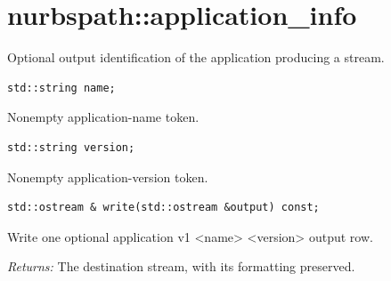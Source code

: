 \begingroup\setlength{\parskip}{2pt}
\section{nurbspath::application\_info}
Optional output identification of the application producing a stream.
\par\noindent\begin{minipage}{\linewidth}
\begin{lstlisting}[style=apireference]
std::string name;
\end{lstlisting}
{\footnotesize Nonempty application-name token.\par}
\end{minipage}\par\vspace{1pt}
\par\noindent\begin{minipage}{\linewidth}
\begin{lstlisting}[style=apireference]
std::string version;
\end{lstlisting}
{\footnotesize Nonempty application-version token.\par}
\end{minipage}\par\vspace{1pt}
\par\noindent\begin{minipage}{\linewidth}
\begin{lstlisting}[style=apireference]
std::ostream & write(std::ostream &output) const;
\end{lstlisting}
{\footnotesize Write one optional application v1 <name> <version> output row.\par}
{\footnotesize\textit{Returns:} The destination stream, with its formatting preserved.\par}
\end{minipage}\par\vspace{1pt}
